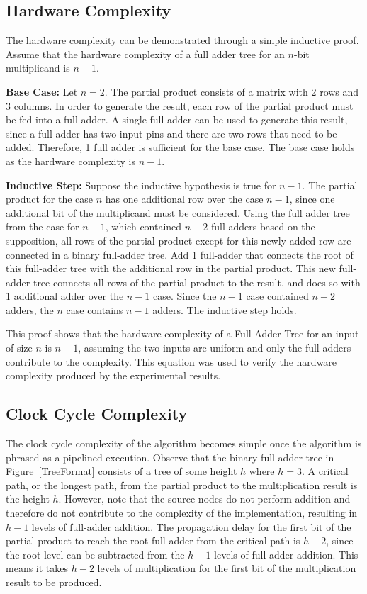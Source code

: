 \documentclass{article}
\begin{document}
\subsection{Hardware Complexity}
The hardware complexity can be demonstrated through a simple inductive proof. Assume that the hardware complexity of a full adder tree for an $n$-bit multiplicand is $n-1$.

\textbf{Base Case:} Let $n = 2$. The partial product consists of a matrix with 2 rows and 3 columns. In order to generate the result, each row of the partial product must be fed into a full adder. A single full adder can be used to generate this result, since a full adder has two input pins and there are two rows that need to be added. Therefore, 1 full adder is sufficient for the base case. The base case holds as the hardware complexity is $n-1$.

\textbf{Inductive Step:} Suppose the inductive hypothesis is true for $n-1$. The partial product for the case $n$ has one additional row over the case $n-1$, since one additional bit of the multiplicand must be considered. Using the full adder tree from the case for $n-1$, which contained $n-2$ full adders based on the supposition, all rows of the partial product except for this newly added row are connected in a binary full-adder tree. Add 1 full-adder that connects the root of this full-adder tree with the additional row in the partial product. This new full-adder tree connects all rows of the partial product to the result, and does so with 1 additional adder over the $n-1$ case. Since the $n-1$ case contained $n-2$ adders, the $n$ case contains $n-1$ adders. The inductive step holds.

This proof shows that the hardware complexity of a Full Adder Tree for an input of size $n$ is $n-1$, assuming the two inputs are uniform and only the full adders contribute to the complexity. This equation was used to verify the hardware complexity produced by the experimental results.

\subsection{Clock Cycle Complexity}
The clock cycle complexity of the algorithm becomes simple once the algorithm is phrased as a pipelined execution. Observe that the binary full-adder tree in Figure~\ref{TreeFormat} consists of a tree of some height $h$ where $h = 3$. A critical path, or the longest path, from the partial product to the multiplication result is the height $h$. However, note that the source nodes do not perform addition and therefore do not contribute to the complexity of the implementation, resulting in $h-1$ levels of full-adder addition. The propagation delay for the first bit of the partial product to reach the root full adder from the critical path is $h-2$, since the root level can be subtracted from the $h-1$ levels of full-adder addition. This means it takes $h-2$ levels of multiplication for the first bit of the multiplication result to be produced.
\end{document}
